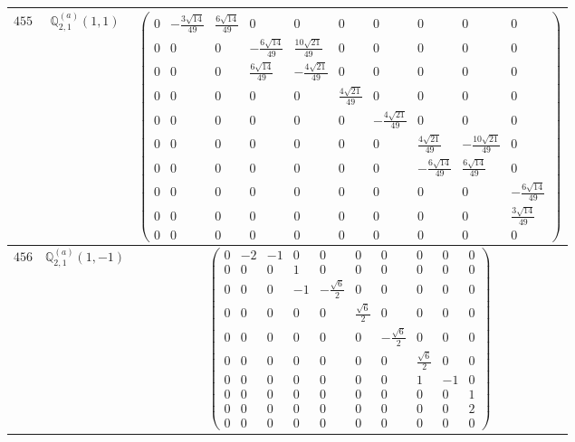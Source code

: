 \documentclass[fleqn,8pt,landscape]{jsarticle}
\begin{document}
\begin{center}
\begin{longtable}{ccc}
$ 455 $ & $ \mathbb{Q}_{2,1}^{(a)}(1,1) $ & $ \begin{pmatrix} 0 & - \frac{3 \sqrt{14}}{49} & \frac{6 \sqrt{14}}{49} & 0 & 0 & 0 & 0 & 0 & 0 & 0 \\ 0 & 0 & 0 & - \frac{6 \sqrt{14}}{49} & \frac{10 \sqrt{21}}{49} & 0 & 0 & 0 & 0 & 0 \\ 0 & 0 & 0 & \frac{6 \sqrt{14}}{49} & - \frac{4 \sqrt{21}}{49} & 0 & 0 & 0 & 0 & 0 \\ 0 & 0 & 0 & 0 & 0 & \frac{4 \sqrt{21}}{49} & 0 & 0 & 0 & 0 \\ 0 & 0 & 0 & 0 & 0 & 0 & - \frac{4 \sqrt{21}}{49} & 0 & 0 & 0 \\ 0 & 0 & 0 & 0 & 0 & 0 & 0 & \frac{4 \sqrt{21}}{49} & - \frac{10 \sqrt{21}}{49} & 0 \\ 0 & 0 & 0 & 0 & 0 & 0 & 0 & - \frac{6 \sqrt{14}}{49} & \frac{6 \sqrt{14}}{49} & 0 \\ 0 & 0 & 0 & 0 & 0 & 0 & 0 & 0 & 0 & - \frac{6 \sqrt{14}}{49} \\ 0 & 0 & 0 & 0 & 0 & 0 & 0 & 0 & 0 & \frac{3 \sqrt{14}}{49} \\ 0 & 0 & 0 & 0 & 0 & 0 & 0 & 0 & 0 & 0 \end{pmatrix} $ \\ \hline
$ 456 $ & $ \mathbb{Q}_{2,1}^{(a)}(1,-1) $ & $ \begin{pmatrix} 0 & -2 & -1 & 0 & 0 & 0 & 0 & 0 & 0 & 0 \\ 0 & 0 & 0 & 1 & 0 & 0 & 0 & 0 & 0 & 0 \\ 0 & 0 & 0 & -1 & - \frac{\sqrt{6}}{2} & 0 & 0 & 0 & 0 & 0 \\ 0 & 0 & 0 & 0 & 0 & \frac{\sqrt{6}}{2} & 0 & 0 & 0 & 0 \\ 0 & 0 & 0 & 0 & 0 & 0 & - \frac{\sqrt{6}}{2} & 0 & 0 & 0 \\ 0 & 0 & 0 & 0 & 0 & 0 & 0 & \frac{\sqrt{6}}{2} & 0 & 0 \\ 0 & 0 & 0 & 0 & 0 & 0 & 0 & 1 & -1 & 0 \\ 0 & 0 & 0 & 0 & 0 & 0 & 0 & 0 & 0 & 1 \\ 0 & 0 & 0 & 0 & 0 & 0 & 0 & 0 & 0 & 2 \\ 0 & 0 & 0 & 0 & 0 & 0 & 0 & 0 & 0 & 0 \end{pmatrix} $ \\ \hline

\end{longtable}
\end{center}
\end{document}
